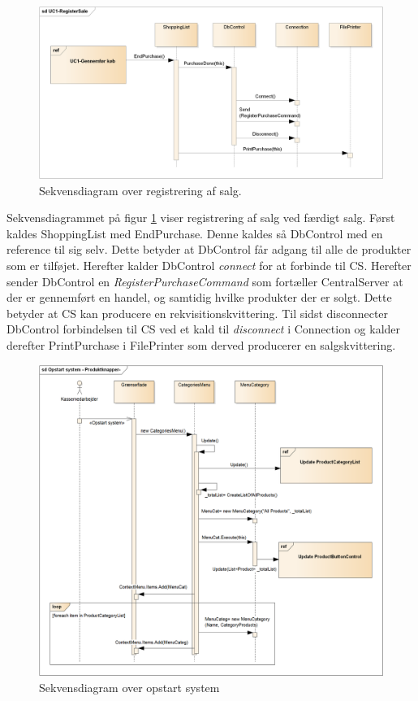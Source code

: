 \begin{figure}[H]
	\centering
	\includegraphics[width=1\textwidth]{Systemdesign/Frontend/GUI/DesignOgStruktur/Pics/RegisterSale}
	\caption{Sekvensdiagram over registrering af salg.}
	\label{fig:SekvensRegisterSale}
\end{figure}

Sekvensdiagrammet på figur \ref{fig:SekvensRegisterSale} viser registrering af salg ved færdigt salg. Først kaldes ShoppingList med EndPurchase. Denne kaldes så DbControl med en reference til sig selv. Dette betyder at DbControl får adgang til alle de produkter som er tilføjet. Herefter kalder DbControl \textit{connect} for at forbinde til \gls{CS}. Herefter sender DbControl en \textit{RegisterPurchaseCommand} som fortæller CentralServer at der er gennemført en handel, og samtidig hvilke produkter der er solgt. Dette betyder at \gls{CS} kan producere en rekvisitionskvittering. Til sidst disconnecter DbControl forbindelsen til \gls{CS} ved et kald til \textit{disconnect} i Connection og kalder derefter PrintPurchase i FilePrinter som derved producerer en salgskvittering.

\begin{figure}[H]
	\centering
	\includegraphics[width=1\textwidth]{Systemdesign/Frontend/GUI/DesignOgStruktur/Pics/OpstartSystem2}
	\caption{Sekvensdiagram over opstart system}
	\label{fig:SekvensOpstart}
\end{figure}


